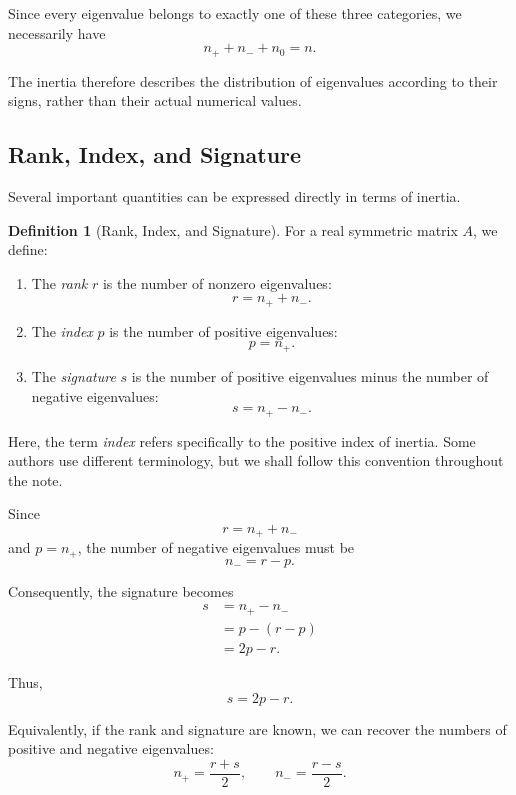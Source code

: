 \documentclass[11pt]{article}
\theoremstyle{definition}
\newtheorem{definition}[theorem]{Definition}
\theoremstyle{remark}
\begin{document}
Since every eigenvalue belongs to exactly one of
these three categories, we necessarily have
\[
    \boxed{n_++n_-+n_0=n}.
\]

The inertia therefore describes the distribution
of eigenvalues according to their signs, rather
than their actual numerical values.

\subsection{Rank, Index, and Signature}

Several important quantities can be expressed
directly in terms of inertia.

\begin{definition}[Rank, Index, and Signature]
For a real symmetric matrix $A$, we define:

\begin{enumerate}
    \item The \emph{rank} $r$ is the number of
    nonzero eigenvalues:
    \[
        r=n_++n_-.
    \]

    \item The \emph{index} $p$ is the number of
    positive eigenvalues:
    \[
        p=n_+.
    \]

    \item The \emph{signature} $s$ is the number
    of positive eigenvalues minus the number
    of negative eigenvalues:
    \[
        s=n_+-n_-.
    \]
\end{enumerate}
\end{definition}

Here, the term \emph{index} refers specifically
to the positive index of inertia. Some authors
use different terminology, but we shall follow
this convention throughout the note.

Since
\[
    r=n_++n_-
\]
and $p=n_+$, the number of negative eigenvalues
must be
\[
    n_-=r-p.
\]

Consequently, the signature becomes
\[
\begin{aligned}
    s
    &=n_+-n_-\\
    &=p-(r-p)\\
    &=2p-r.
\end{aligned}
\]

Thus,
\[
    \boxed{s=2p-r}.
\]

Equivalently, if the rank and signature are known,
we can recover the numbers of positive and negative
eigenvalues:
\[
    \boxed{
    n_+=\frac{r+s}{2},
    \qquad
    n_-=\frac{r-s}{2}
    }.
\]
\end{document}
